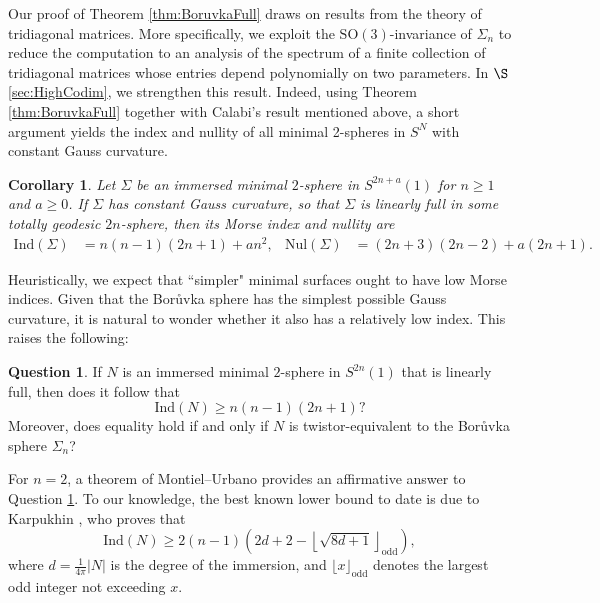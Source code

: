 \documentclass[11pt]{article}
\newcommand{\SO}{\mathrm{SO}}
\newtheorem{cor}[thm]{Corollary}
\theoremstyle{definition}
\newtheorem{question}[thm]{Question}
\numberwithin{equation}{section}
\begin{document}
\indent Our proof of Theorem \ref{thm:BoruvkaFull} draws on results from the theory of tridiagonal matrices.  More specifically, we exploit the $\SO(3)$-invariance of $\Sigma_n$ to reduce the computation to an analysis of the spectrum of a finite collection of tridiagonal matrices whose entries depend polynomially on two parameters.  In $\S$\ref{sec:HighCodim}, we strengthen this result.  Indeed, using Theorem \ref{thm:BoruvkaFull} together with Calabi’s result mentioned above, a short argument yields the index and nullity of all minimal 2-spheres in $S^N$ with constant Gauss curvature.

\begin{cor} \label{cor:HighCodim} Let $\Sigma$ be an immersed minimal $2$-sphere in $S^{2n+a}(1)$ for $n \geq 1$ and $a \geq 0$.  If $\Sigma$ has constant Gauss curvature, so that $\Sigma$ is linearly full in some totally geodesic $2n$-sphere, then its Morse index and nullity are
\begin{align*}
\mathrm{Ind}(\Sigma) & = n(n-1)(2n+1) + an^2, & \mathrm{Nul}(\Sigma) & = (2n+3)(2n-2) + a(2n+1).
\end{align*}
\end{cor}

Heuristically, we expect that ``simpler" minimal surfaces ought to have low Morse indices.  Given that the Bor{\r{u}}vka sphere has the simplest possible Gauss curvature, it is natural to wonder whether it also has a relatively low index.  This raises the following:

\begin{question} \label{question} If $N$ is an immersed minimal $2$-sphere in $S^{2n}(1)$ that is linearly full, then does it follow that
$$\mathrm{Ind}(N) \geq n(n-1)(2n+1)?$$
Moreover, does equality hold if and only if $N$ is twistor-equivalent to the Bor{\r{u}}vka sphere $\Sigma_n$?
\end{question}

For $n = 2$, a theorem of Montiel--Urbano \cite{MontUrb97} provides an affirmative answer to Question \ref{question}.  To our knowledge, the best known lower bound to date is due to Karpukhin \cite{Karpukhin21}, who proves that
$$\mathrm{Ind}(N) \geq 2(n-1)\left( 2d + 2 - \left\lfloor \sqrt{8d + 1} \right\rfloor_{\mathrm{odd}}  \right)\!,$$
where $d = \frac{1}{4\pi}|N|$ is the degree of the immersion, and $\lfloor x\rfloor_{\mathrm{odd}}$ denotes the largest odd integer not exceeding $x$. \\
\end{document}

